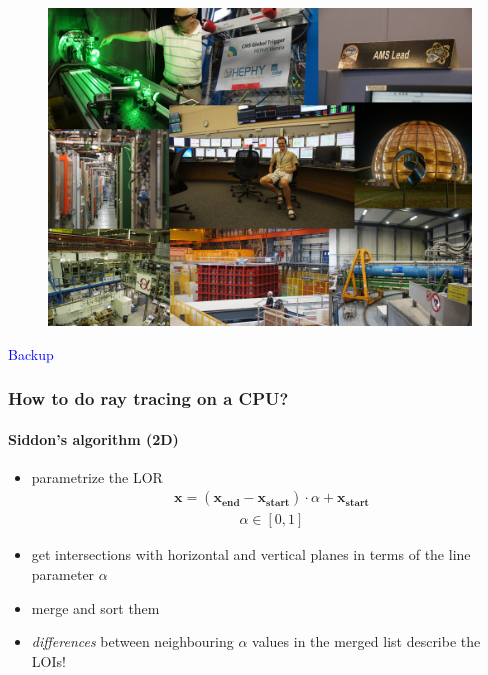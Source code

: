 \documentclass{beamer}
\begin{document}
\begin{frame}
  \begin{figure}
    \includegraphics[width = \textwidth]{../Collage.jpg}
  \end{figure}
\end{frame}


\begin{frame}
  \begin{center}
    \huge
    \textcolor{blue}{Backup}
  \end{center}
\end{frame}

\begin{frame}
  \frametitle{How to do ray tracing on a CPU?}
  \framesubtitle{Siddon's algorithm (2D)}
  \begin{itemize}
    \item parametrize the LOR
      \begin{align*} \mathbf{x} = (\mathbf{x_{end}} - \mathbf{x_{start}}) \cdot \alpha + \mathbf{x_{start}} \end{align*}
      \begin{align*} \alpha \in [0,1] \end{align*}
    \item get intersections with horizontal and vertical planes in terms of the line parameter $\alpha$
    \item merge and sort them
    \item \textsl{differences} between neighbouring $\alpha$ values in the merged list describe the LOIs!
  \end{itemize}
\end{frame}
\end{document}
